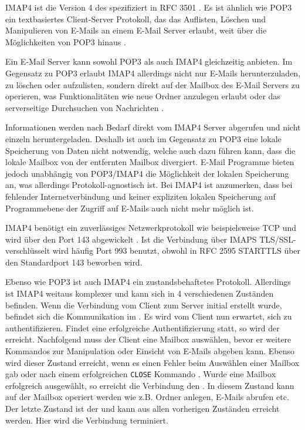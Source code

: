 IMAP4 ist die Version 4 des  spezifiziert in RFC 3501 . Es ist ähnlich wie POP3 ein textbasiertes Client-Server Protokoll, das das Auflisten, Löschen und Manipulieren von E-Mails an einem E-Mail Server erlaubt, weit über die Möglichkeiten von POP3 hinaus .

Ein E-Mail Server kann sowohl POP3 als auch IMAP4 gleichzeitig anbieten. Im Gegensatz zu POP3 erlaubt IMAP4 allerdings nicht nur E-Mails herunterzuladen, zu löschen oder aufzulisten, sondern direkt auf der Mailbox des E-Mail Servers zu operieren, was Funktionalitäten wie neue Ordner anzulegen erlaubt  oder das serverseitige Durchsuchen von Nachrichten .

Informationen werden nach Bedarf direkt vom IMAP4 Server abgerufen und nicht einzeln heruntergeladen. Deshalb ist auch im Gegensatz zu POP3 eine lokale Speicherung von Daten nicht notwendig, welche auch dazu führen kann, dass die lokale Mailbox von der entfernten Mailbox divergiert. E-Mail Programme bieten jedoch unabhängig von POP3/IMAP4 die Möglichkeit der lokalen Speicherung an, was allerdings Protokoll-agnostisch ist. Bei IMAP4 ist anzumerken, dass bei fehlender Internetverbindung und keiner expliziten lokalen Speicherung auf Programmebene der Zugriff auf E-Mails auch nicht mehr möglich ist.

IMAP4 benötigt ein zuverlässiges Netzwerkprotokoll wie beispielsweise TCP und wird über den Port 143 abgewickelt . Ist die Verbindung über IMAPS TLS/SSL-verschlüsselt wird häufig Port 993 benutzt, obwohl in RFC 2595  STARTTLS über den Standardport 143 beworben wird.

Ebenso wie POP3 ist auch IMAP4 ein zustandsbehaftetes Protokoll. Allerdings ist IMAP4 weitaus komplexer und kann sich in 4 verschiedenen Zuständen befinden. Wenn die Verbindung vom Client zum Server initial erstellt wurde, befindet sich die Kommunikation im . Es wird vom Client nun erwartet, sich zu authentifizieren. Findet eine erfolgreiche Authentifizierung statt, so wird der  erreicht. Nachfolgend muss der Client eine Mailbox auswählen, bevor er weitere Kommandos zur Manipulation oder Einsicht von E-Mails abgeben kann. Ebenso wird dieser Zustand erreicht, wenn es einen Fehler beim Auswählen einer Mailbox gab oder nach einem erfolgreichen \verb#CLOSE# Kommando . Wurde eine Mailbox erfolgreich ausgewählt, so erreicht die Verbindung den . In diesem Zustand kann auf der Mailbox operiert werden wie z.B. Ordner anlegen, E-Mails abrufen etc. Der letzte Zustand ist der  und kann aus allen vorherigen Zuständen erreicht werden. Hier wird die Verbindung terminiert.

